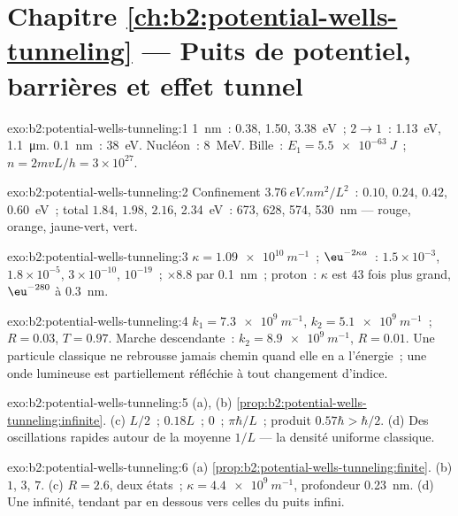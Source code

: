 \section*{Chapitre \ref{ch:b2:potential-wells-tunneling} --- Puits de potentiel, barrières et effet tunnel}

\begin{solution}{exo:b2:potential-wells-tunneling:1}
\qty{1}{nm}~: \qty{0.38}{}, \qty{1.50}{}, \qty{3.38}{eV}~; $2 \to 1$~: \qty{1.13}{eV}, \qty{1.1}{\micro m}.
\qty{0.1}{nm}~: \qty{38}{eV}. Nucléon~: \qty{8}{MeV}. Bille~: $E_1 = \qty{5.5e-63}{J}$~;
$n = 2mvL/h = 3 \times 10^{27}$.
\end{solution}

\begin{solution}{exo:b2:potential-wells-tunneling:2}
Confinement $\qty{3.76}{eV.nm^2}/L^2$~: $0.10$, $0.24$, $0.42$, \qty{0.60}{eV}~; total
$1.84$, $1.98$, $2.16$, \qty{2.34}{eV}~: \qty{673}{}, \qty{628}{}, \qty{574}{}, \qty{530}{nm} ---
rouge, orange, jaune-vert, vert.
\end{solution}

\begin{solution}{exo:b2:potential-wells-tunneling:3}
$\kappa = \qty{1.09e10}{m^{-1}}$~; $\eu^{-2\kappa a}$~: $1.5 \times 10^{-3}$, $1.8 \times 10^{-5}$,
$3 \times 10^{-10}$, $10^{-19}$~; $\times 8.8$ par \qty{0.1}{nm}~; proton~: $\kappa$ est
$43$ fois plus grand, $\eu^{-280}$ à \qty{0.3}{nm}.
\end{solution}

\begin{solution}{exo:b2:potential-wells-tunneling:4}
$k_1 = \qty{7.3e9}{m^{-1}}$, $k_2 = \qty{5.1e9}{m^{-1}}$~; $R = 0.03$, $T = 0.97$. Marche
descendante~: $k_2 = \qty{8.9e9}{m^{-1}}$, $R = 0.01$. Une particule classique ne
rebrousse jamais chemin quand elle en a l'énergie~; une onde lumineuse est partiellement réfléchie
à tout changement d'indice.
\end{solution}

\begin{solution}{exo:b2:potential-wells-tunneling:5}
(a), (b) \cref{prop:b2:potential-wells-tunneling:infinite}. (c) $L/2$~;
$0.18L$~; $0$~; $\pi\hbar/L$~; produit $0.57\hbar > \hbar/2$. (d) Des oscillations
rapides autour de la moyenne $1/L$ --- la densité uniforme classique.
\end{solution}

\begin{solution}{exo:b2:potential-wells-tunneling:6}
(a) \cref{prop:b2:potential-wells-tunneling:finite}. (b) $1$, $3$, $7$.
(c) $R = 2.6$, deux états~; $\kappa = \qty{4.4e9}{m^{-1}}$, profondeur \qty{0.23}{nm}. (d)
Une infinité, tendant par en dessous vers celles du puits infini.
\end{solution}

